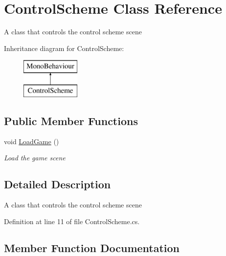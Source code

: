 \hypertarget{class_control_scheme}{}\section{Control\+Scheme Class Reference}
\label{class_control_scheme}


A class that controls the control scheme scene  


Inheritance diagram for Control\+Scheme\+:\begin{figure}[H]
\begin{center}
\leavevmode
\includegraphics[height=2.000000cm]{class_control_scheme}
\end{center}
\end{figure}
\subsection*{Public Member Functions}
\begin{DoxyCompactItemize}
\item 
void \mbox{\hyperlink{class_control_scheme_addb29fabf571ce6558a7a09b58ab7b3f}{Load\+Game}} ()
\begin{DoxyCompactList}\small\item\em Load the game scene \end{DoxyCompactList}\end{DoxyCompactItemize}


\subsection{Detailed Description}
A class that controls the control scheme scene 



Definition at line 11 of file Control\+Scheme.\+cs.



\subsection{Member Function Documentation}
\mbox{\label{class_control_scheme_addb29fabf571ce6558a7a09b58ab7b3f}} 
